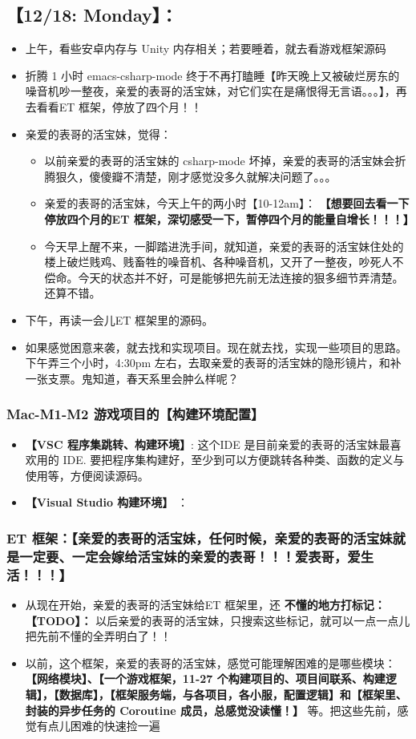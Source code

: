 \documentclass[9pt, b5paper]{article}
\begin{document}
\subsection{【12/18: Monday】：}
\label{sec-2-1}
\begin{itemize}
\item 上午，看些安卓内存与 Unity 内存相关；若要睡着，就去看游戏框架源码
\item 折腾 1 小时 emacs-csharp-mode 终于不再打瞌睡【昨天晚上又被破烂房东的噪音机吵一整夜，亲爱的表哥的活宝妹，对它们实在是痛恨得无言语。。。】，再去看看ET 框架，停放了四个月！！
\item 亲爱的表哥的活宝妹，觉得：
\begin{itemize}
\item 以前亲爱的表哥的活宝妹的 csharp-mode 坏掉，亲爱的表哥的活宝妹会折腾狠久，傻傻瓣不清楚，刚才感觉没多久就解决问题了。。。
\item 亲爱的表哥的活宝妹，今天上午的两小时【10-12am】： \textbf{【想要回去看一下停放四个月的ET 框架，深切感受一下，暂停四个月的能量自增长！！！】}
\item 今天早上醒不来，一脚踏进洗手间，就知道，亲爱的表哥的活宝妹住处的楼上破烂贱鸡、贱畜牲的噪音机、各种噪音机，又开了一整夜，吵死人不偿命。今天的状态并不好，可是能够把先前无法连接的狠多细节弄清楚。还算不错。
\end{itemize}
\item 下午，再读一会儿ET 框架里的源码。
\item 如果感觉困意来袭，就去找和实现项目。现在就去找，实现一些项目的思路。下午弄三个小时，4:30pm 左右，去取亲爱的表哥的活宝妹的隐形镜片，和补一张支票。鬼知道，春天系里会肿么样呢？
\end{itemize}
\subsubsection{Mac-M1-M2 游戏项目的【构建环境配置】}
\label{sec-2-1-1}
\begin{itemize}
\item \textbf{【VSC 程序集跳转、构建环境】}: 这个IDE 是目前亲爱的表哥的活宝妹最喜欢用的 IDE. 要把程序集构建好，至少到可以方便跳转各种类、函数的定义与使用等，方便阅读源码。
\item \textbf{【Visual Studio 构建环境】} ：
\end{itemize}
\subsubsection{ET 框架：【亲爱的表哥的活宝妹，任何时候，亲爱的表哥的活宝妹就是一定要、一定会嫁给活宝妹的亲爱的表哥！！！爱表哥，爱生活！！！】}
\label{sec-2-1-2}
\begin{itemize}
\item 从现在开始，亲爱的表哥的活宝妹给ET 框架里，还 \textbf{不懂的地方打标记：【TODO】：} 以后亲爱的表哥的活宝妹，只搜索这些标记，就可以一点一点儿把先前不懂的全弄明白了！！
\item 以前，这个框架，亲爱的表哥的活宝妹，感觉可能理解困难的是哪些模块： \textbf{【网络模块】、【一个游戏框架，11-27 个构建项目的、项目间联系、构建逻辑】，【数据库】，【框架服务端，与各项目，各小服，配置逻辑】和【框架里、封装的异步任务的 Coroutine 成员，总感觉没读懂！】} 等。把这些先前，感觉有点儿困难的快速捡一遍
\end{itemize}
\end{document}
